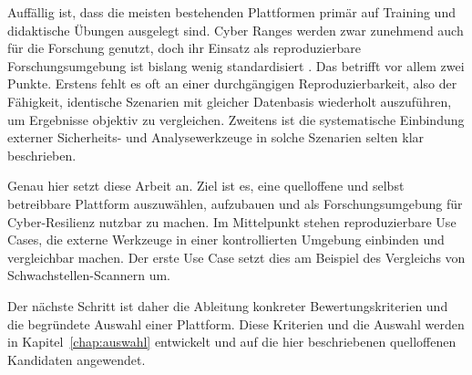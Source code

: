 Auffällig ist, dass die meisten bestehenden Plattformen primär auf Training und didaktische Übungen
ausgelegt sind. Cyber Ranges werden zwar zunehmend auch für die Forschung genutzt, doch ihr Einsatz
als reproduzierbare Forschungsumgebung ist bislang wenig standardisiert \cite{Chouliaras2021}. Das
betrifft vor allem zwei Punkte. Erstens fehlt es oft an einer durchgängigen Reproduzierbarkeit,
also der Fähigkeit, identische Szenarien mit gleicher Datenbasis wiederholt auszuführen, um
Ergebnisse objektiv zu vergleichen. Zweitens ist die systematische Einbindung externer Sicherheits-
und Analysewerkzeuge in solche Szenarien selten klar beschrieben.
 
Genau hier setzt diese Arbeit an. Ziel ist es, eine quelloffene und selbst betreibbare Plattform
auszuwählen, aufzubauen und als Forschungsumgebung für Cyber-Resilienz nutzbar zu machen. Im
Mittelpunkt stehen reproduzierbare Use Cases, die externe Werkzeuge in einer kontrollierten
Umgebung einbinden und vergleichbar machen. Der erste Use Case setzt dies am Beispiel des Vergleichs
von Schwachstellen-Scannern um.
 
Der nächste Schritt ist daher die Ableitung konkreter Bewertungskriterien und die begründete Auswahl
einer Plattform. Diese Kriterien und die Auswahl werden in Kapitel~\ref{chap:auswahl} entwickelt und
auf die hier beschriebenen quelloffenen Kandidaten angewendet.
 























